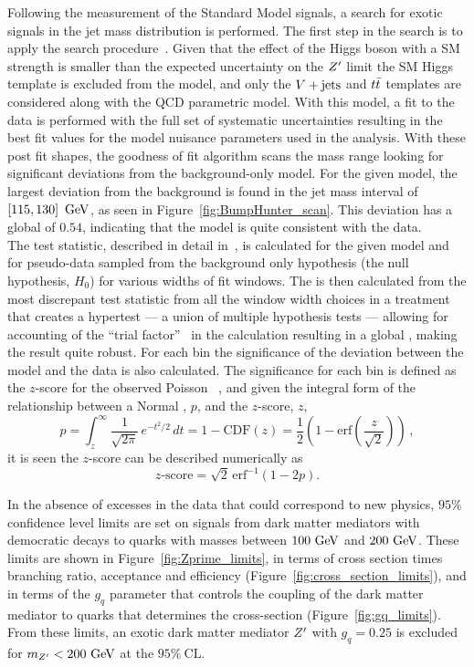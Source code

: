 Following the measurement of the Standard Model signals, a search for exotic signals in the \largeR jet mass distribution is performed.
The first step in the search is to apply the \BumpHunter{} search procedure~\cite{Aaltonen:2008vt,Choudalakis:2011qn}.
Given that the effect of the Higgs boson with a SM strength is smaller than the expected uncertainty on the $Z'$ limit the SM Higgs template is excluded from the model, and only the $V + \text{jets}$ and $t\bar{t}$ templates are considered along with the QCD parametric model.
With this model, a fit to the data is performed with the full set of systematic uncertainties resulting in the best fit values for the model nuisance parameters used in the analysis.
With these post fit shapes, the \BumpHunter{} goodness of fit algorithm scans the mass range looking for significant deviations from the background-only model.
For the given model, the largest deviation from the background is found in the \largeR jet mass interval of $\left[115,130\right]~\mathrm{GeV}$, as seen in Figure~\ref{fig:BumpHunter_scan}.
This deviation has a \BumpHunter{} global \pvalue{} of $0.54$, indicating that the model is quite consistent with the data.\\

The \BumpHunter{} test statistic, described in detail in~\cite{Choudalakis:2011qn}, is calculated for the given model and for pseudo-data sampled from the background only hypothesis (the null hypothesis, $H_{0}$) for various widths of fit windows.
The \BumpHunter{} \pvalue{} is then calculated from the most discrepant test statistic from all the window width choices in a treatment that creates a hypertest --- a union of multiple hypothesis tests --- allowing for accounting of the ``trial factor''~\cite{Gross:2010qma} in the calculation resulting in a global \pvalue{}, making the result quite robust.
For each bin the significance of the deviation between the model and the data is also calculated.
The significance for each bin is defined as the $z$-score for the observed Poisson \pvalue{}~\cite{Choudalakis:2012}, and given the integral form of the relationship between a Normal \pvalue{}, $p$, and the $z$-score, $z$,
\[
p = \int_{z}^{\infty} \frac{1}{\sqrt{2\pi}}\,e^{-t^2/2}\,dt = 1 - \mathrm{CDF}\left(z\right) = \frac{1}{2}\left(1 - \mathrm{erf}\left(\frac{z}{\sqrt{2}}\right)\right)\,,
\]
it is seen the $z$-score can be described numerically as
\[
z\textrm{-score} = \sqrt{2}\, \mathrm{erf}^{-1}\left(1-2p\right).
\]

In the absence of excesses in the data that could correspond to new physics, $95\%$ confidence level limits are set on signals from dark matter mediators with democratic decays to quarks with masses between $100~\mathrm{GeV}$ and $200~\mathrm{GeV}$.
These limits are shown in Figure~\ref{fig:Zprime_limits}, in terms of cross section times branching ratio, acceptance and efficiency (Figure~\ref{fig:cross_section_limits}), and in terms of the $g_{q}$ parameter that controls the coupling of the \gls{dark matter mediator} to quarks that determines the cross-section (Figure~\ref{fig:gq_limits}).
From these limits, an exotic dark matter mediator $Z'$ with $g_{q}=0.25$ is excluded for $m_{Z'} < 200~\mathrm{GeV}$ at the $95\%~\mathrm{CL}$.

